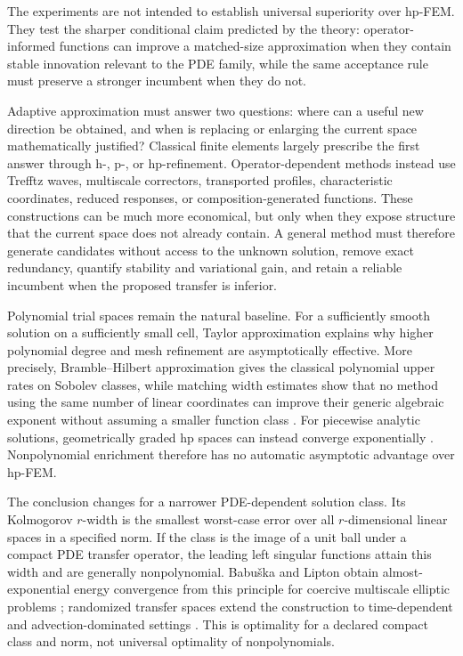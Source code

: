 \documentclass[11pt]{article}
\numberwithin{algorithm}{section}
\theoremstyle{definition}\newtheorem{definition}[theorem]{Definition}
\theoremstyle{remark}\newtheorem{remark}[theorem]{Remark}
\begin{document}
The experiments are not intended to establish universal superiority over
hp-FEM.  They test the sharper conditional claim predicted by the theory:
operator-informed functions can improve a matched-size approximation when
they contain stable innovation relevant to the PDE family, while the same
acceptance rule must preserve a stronger incumbent when they do not.

\iffalse
Adaptive approximation must answer two questions: where can a useful new
direction be obtained, and when is replacing or enlarging the current space
mathematically justified?  Classical finite elements largely prescribe the
first answer through h-, p-, or hp-refinement.  Operator-dependent methods
instead use Trefftz waves, multiscale correctors, transported profiles,
characteristic coordinates, reduced responses, or composition-generated
functions.  These constructions can be much more economical, but only when
they expose structure that the current space does not already contain.  A
general method must therefore generate candidates without access to the
unknown solution, remove exact redundancy, quantify stability and variational
gain, and retain a reliable incumbent when the proposed transfer is inferior.

Polynomial trial spaces remain the natural baseline. For a sufficiently smooth
solution on a sufficiently small cell, Taylor approximation explains why
higher polynomial degree and mesh refinement are asymptotically effective.
More precisely, Bramble--Hilbert approximation gives the classical polynomial
upper rates on Sobolev classes, while matching width estimates show that no
method using the same number of linear coordinates can improve their generic
algebraic exponent without assuming a smaller function class
\cite{ciarlet1978,pinkus1985}.  For piecewise analytic solutions, geometrically
graded hp spaces can instead converge exponentially
\cite{schwab1998}.  Nonpolynomial enrichment therefore has no automatic
asymptotic advantage over hp-FEM.

The conclusion changes for a narrower PDE-dependent solution class.  Its
Kolmogorov $r$-width is the smallest worst-case error over all
$r$-dimensional linear spaces in a specified norm.  If the class is the image
of a unit ball under a compact PDE transfer operator, the leading left
singular functions attain this width and are generally nonpolynomial.
Babu\v{s}ka and Lipton obtain almost-exponential energy convergence from this
principle for coercive multiscale elliptic problems
\cite{babuskalipton2011}; randomized transfer spaces extend the construction
to time-dependent and advection-dominated settings
\cite{schleusssmetanatermaat2023}.  This is optimality for a declared compact
class and norm, not universal optimality of nonpolynomials.
\end{document}
